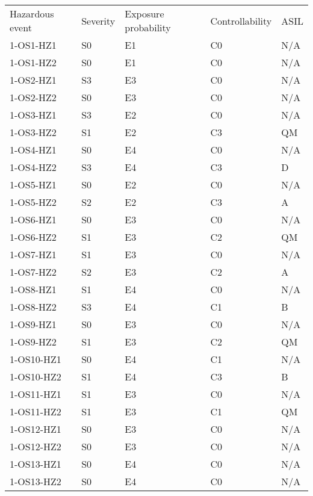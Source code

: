 \begin{center}
\begin{tabular}{l|l|l|l|l}
Hazardous event	& Severity	& Exposure probability	& Controllability	& ASIL	\\
1-OS1-HZ1			& S0		& E1					& C0				& N/A	\\
1-OS1-HZ2			& S0		& E1					& C0				& N/A	\\
1-OS2-HZ1			& S3		& E3					& C0				& N/A	\\
1-OS2-HZ2			& S0		& E3					& C0				& N/A	\\
1-OS3-HZ1			& S3		& E2					& C0				& N/A	\\
1-OS3-HZ2			& S1		& E2					& C3				& QM	\\
1-OS4-HZ1			& S0		& E4					& C0				& N/A	\\
1-OS4-HZ2			& S3		& E4					& C3				& D		\\
1-OS5-HZ1			& S0		& E2					& C0				& N/A	\\
1-OS5-HZ2			& S2		& E2					& C3				& A		\\
1-OS6-HZ1			& S0		& E3					& C0				& N/A	\\
1-OS6-HZ2			& S1		& E3					& C2				& QM	\\
1-OS7-HZ1			& S1		& E3					& C0				& N/A	\\
1-OS7-HZ2			& S2		& E3					& C2				& A		\\
1-OS8-HZ1			& S1		& E4					& C0				& N/A	\\
1-OS8-HZ2			& S3		& E4					& C1				& B		\\
1-OS9-HZ1			& S0		& E3					& C0				& N/A	\\
1-OS9-HZ2			& S1		& E3					& C2				& QM	\\
1-OS10-HZ1			& S0		& E4					& C1				& N/A	\\
1-OS10-HZ2			& S1		& E4					& C3				& B		\\
1-OS11-HZ1			& S1		& E3					& C0				& N/A	\\
1-OS11-HZ2			& S1		& E3					& C1				& QM	\\
1-OS12-HZ1			& S0		& E3					& C0				& N/A	\\
1-OS12-HZ2			& S0		& E3					& C0				& N/A	\\
1-OS13-HZ1			& S0		& E4					& C0				& N/A	\\
1-OS13-HZ2			& S0		& E4					& C0				& N/A
\end{tabular}
\end{center}